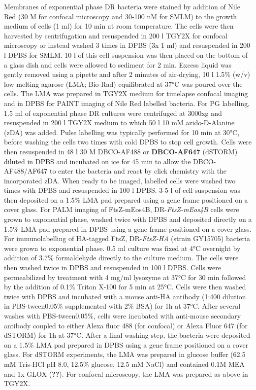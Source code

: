 Membranes of exponential phase DR bacteria were stained by addition of Nile Red (30 \mu{}M for confocal microscopy and 30-100 nM for SMLM) to the growth medium of cells (1 ml) for 10 min at room temperature.
The cells were then harvested by centrifugation and resuspended in 200 \mu{}l TGY2X for confocal microscopy or instead washed 3 times in DPBS (3x 1 ml) and resuspended in 200 \mu{}l DPBS for SMLM.
10 \mu{}l of this cell suspension was then placed on the bottom of a glass dish and cells were allowed to sediment for 2 min.
Excess liquid was gently removed using a pipette and after 2 minutes of air-drying, 10 \mu{}l 1.5\% (w/v) low melting agarose (LMA; Bio-Rad) equilibrated at \ang{37}C was poured over the cells.
The LMA was prepared in TGY2X medium for timelapse confocal imaging and in DPBS for PAINT imaging of Nile Red labelled bacteria.
For PG labelling, 1.5 ml of exponential phase DR cultures were centrifuged at 3000xg and resuspended in 200 \mu{}l TGY2X medium to which 50 \mu{}l 10 mM azido-D-Alanine (zDA) was added.
Pulse labelling was typically performed for 10 min at \ang{30}C, before washing the cells two times with cold DPBS to stop cell growth.
Cells were then resuspended in 48 \mu{}l 30 \mu{}M DBCO-AF488 or \textbf{DBCO-AF647} (dSTORM) diluted in DPBS and incubated on ice for 45 min to allow the DBCO-AF488/AF647 to enter the bacteria and react by click chemistry with the incorporated zDA.
When ready to be imaged, labelled cells were washed two times with DPBS and resuspended in 100 \mu{}l DPBS.
3-5 \mu{}l of cell suspension was then deposited on a 1.5\% LMA pad prepared using a gene frame positioned on a cover glass.
For PALM imaging of FtsZ-mEos4B, DR-\textit{FtsZ-mEos4B} cells were grown to exponential phase, washed twice with DPBS and deposited directly on a 1.5\% LMA pad prepared in DPBS using a gene frame positioned on a cover glass.
For immunolabelling of HA-tagged FtsZ, DR-\textit{FtsZ-HA} (strain GY15705) bacteria were grown to exponential phase.
0.5 ml culture was fixed at \ang{4}C overnight by addition of 3.7\% formaldehyde directly to the culture medium.
The cells were then washed twice in DPBS and resuspended in 100 \mu{}l DPBS.
Cells were permeabilized by treatment with 4 mg/ml lysozyme at \ang{37}C for 30 min followed by the addition of 0.1\% Triton X-100 for 5 min at \ang{25}C.
Cells were then washed twice with DPBS and incubated with a mouse anti-HA antibody (1:400 dilution in PBS-tween0.05\% supplemented with 2\% BSA) for 1h at \ang{37}C.
After several washes with PBS-tween0.05\%, cells were incubated with anti-mouse secondary antibody coupled to either Alexa fluor 488 (for confocal) or Alexa Fluor 647 (for dSTORM) for 1h at \ang{37}C.
After a final washing step, the bacteria were deposited on a 1.5\% LMA pad prepared in DPBS using a gene frame positioned on a cover glass.
For dSTORM experiments, the LMA was prepared in glucose buffer (62.5 mM Tris-HCl pH 8.0, 12.5\% glucose, 12.5 mM NaCl) and contained 0.1M MEA and 1x GLOX (\textbf{??}).
For confocal microscopy, the LMA was prepared as above in TGY2X.

